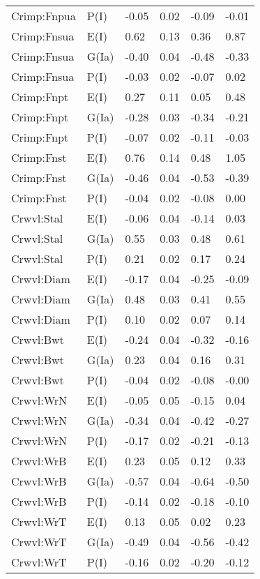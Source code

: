 \begin{center}
\begin{longtable}{|p{1.1in}|p{0.7in}|p{0.7in}|p{0.6in}|p{0.6in}|p{0.6in}|}
  Crimp:Fnpua & P(I) & -0.05 & 0.02 & -0.09 & -0.01 \\ 
  Crimp:Fnsua & E(I) & 0.62 & 0.13 & 0.36 & 0.87 \\ 
  Crimp:Fnsua & G(Ia) & -0.40 & 0.04 & -0.48 & -0.33 \\ 
  Crimp:Fnsua & P(I) & -0.03 & 0.02 & -0.07 & 0.02 \\ 
  Crimp:Fnpt & E(I) & 0.27 & 0.11 & 0.05 & 0.48 \\ 
  Crimp:Fnpt & G(Ia) & -0.28 & 0.03 & -0.34 & -0.21 \\ 
  Crimp:Fnpt & P(I) & -0.07 & 0.02 & -0.11 & -0.03 \\ 
  Crimp:Fnst & E(I) & 0.76 & 0.14 & 0.48 & 1.05 \\ 
  Crimp:Fnst & G(Ia) & -0.46 & 0.04 & -0.53 & -0.39 \\ 
  Crimp:Fnst & P(I) & -0.04 & 0.02 & -0.08 & 0.00 \\ 
  Crwvl:Stal & E(I) & -0.06 & 0.04 & -0.14 & 0.03 \\ 
  Crwvl:Stal & G(Ia) & 0.55 & 0.03 & 0.48 & 0.61 \\ 
  Crwvl:Stal & P(I) & 0.21 & 0.02 & 0.17 & 0.24 \\ 
  Crwvl:Diam & E(I) & -0.17 & 0.04 & -0.25 & -0.09 \\ 
  Crwvl:Diam & G(Ia) & 0.48 & 0.03 & 0.41 & 0.55 \\ 
  Crwvl:Diam & P(I) & 0.10 & 0.02 & 0.07 & 0.14 \\ 
  Crwvl:Bwt & E(I) & -0.24 & 0.04 & -0.32 & -0.16 \\ 
  Crwvl:Bwt & G(Ia) & 0.23 & 0.04 & 0.16 & 0.31 \\ 
  Crwvl:Bwt & P(I) & -0.04 & 0.02 & -0.08 & -0.00 \\ 
  Crwvl:WrN & E(I) & -0.05 & 0.05 & -0.15 & 0.04 \\ 
  Crwvl:WrN & G(Ia) & -0.34 & 0.04 & -0.42 & -0.27 \\ 
  Crwvl:WrN & P(I) & -0.17 & 0.02 & -0.21 & -0.13 \\ 
  Crwvl:WrB & E(I) & 0.23 & 0.05 & 0.12 & 0.33 \\ 
  Crwvl:WrB & G(Ia) & -0.57 & 0.04 & -0.64 & -0.50 \\ 
  Crwvl:WrB & P(I) & -0.14 & 0.02 & -0.18 & -0.10 \\ 
  Crwvl:WrT & E(I) & 0.13 & 0.05 & 0.02 & 0.23 \\ 
  Crwvl:WrT & G(Ia) & -0.49 & 0.04 & -0.56 & -0.42 \\ 
  Crwvl:WrT & P(I) & -0.16 & 0.02 & -0.20 & -0.12 \\ 

\end{longtable}
\end{center}
